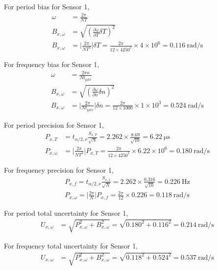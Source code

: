 For period bias for Sensor 1, 
\begin{align*}
    \omega &= \frac{2 \pi}{N T} \\
    B_{x, \omega} &= \sqrt{\left(\frac{\partial \omega}{\partial T} \delta T\right)^2} \\
    B_{x, \omega} &= \bigg| \frac{2 \pi}{N T^2} \bigg| \delta T = \frac{2\pi}{12 \times 4250^2} \times 4 \times 10^6 = \qty{0.116}{\radian\per\second} 
\end{align*}

For frequency bias for Sensor 1,
\begin{align*}
    \omega &= \frac{2 \pi n}{N t_{\text{gate}}} \\
    B_{x, \omega} &= \sqrt{\left(\frac{\partial \omega}{\partial n} \delta n\right)^2} \\
    B_{x, \omega} &= \bigg| \frac{2 \pi}{N t_{\text{gate}}} \bigg| \delta n = \frac{2\pi}{12 \times 1000} \times 1 \times 10^3 = \qty{0.524}{\radian\per\second}
\end{align*}

For period precision for Sensor 1,
\begin{align*}
    P_{x, T} &= t_{\alpha/2, \nu} \frac{S_{x, T}}{\sqrt{N}} = 2.262 \times \frac{8.69}{\sqrt{10}} = \qty{6.22}{\micro\second} \\
    P_{x, \omega} &= \bigg| \frac{2 \pi}{N T^2} \bigg| P_{x, T} = \frac{2\pi}{12 \times 4250^2} \times 6.22 \times 10^6 = \qty{0.180}{\radian\per\second}
\end{align*}

For frequency precision for Sensor 1,
\begin{gather*}
    P_{x, f} = t_{\alpha/2, \nu} \frac{S_{x, f}}{\sqrt{N}} = 2.262 \times \frac{0.316}{\sqrt{10}} = \qty{0.226}{\hertz} \\
    P_{x, \omega} = \bigg| \frac{2 \pi}{N} \bigg| P_{x, f} = \frac{2\pi}{12} \times 0.226 = \qty{0.118}{\radian\per\second}
\end{gather*}

For period total uncertainty for Sensor 1,
\begin{align*}
    U_{x, \omega} &= \sqrt{P_{x, \omega}^2 + B_{x, \omega}^2} = \sqrt{0.180^2 + 0.116^2} = \qty{0.214}{\radian\per\second} 
\end{align*}

For frequency total uncertainty for Sensor 1,
\begin{align*}
    U_{x, \omega} &= \sqrt{P_{x, \omega}^2 + B_{x, \omega}^2} = \sqrt{0.118^2 + 0.524^2} = \qty{0.537}{\radian\per\second}
\end{align*}


